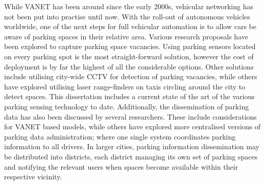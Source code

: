 
While \ac{VANET} has been around since the early 2000s, vehicular networking has not been put into practise until now. With the roll-out of autonomous vehicles worldwide, one of the next steps for full vehicular automation is to allow cars be aware of parking spaces in their relative area. Various research proposals have been explored to capture parking space vacancies. Using parking sensors located on every parking spot is the most straight-forward solution, however the cost of deployment is by far the highest of all the considerable options. Other solutions include utilising city-wide \ac{CCTV} for detection of parking vacancies, while others have explored utilising laser range-finders on taxis circling around the city to detect spaces. This dissertation includes a current state of the art of the various parking sensing technology to date. Additionally, the dissemination of parking data has also been discussed by several researchers. These include considerations for \ac{VANET} based models, while others have explored more centralised versions of parking data administration; where one single system coordinates parking information to all drivers. In larger cities, parking information dissemination may be distributed into districts, each district managing its own set of parking spaces and notifying the relevant users when spaces become available within their respective vicinity.\\